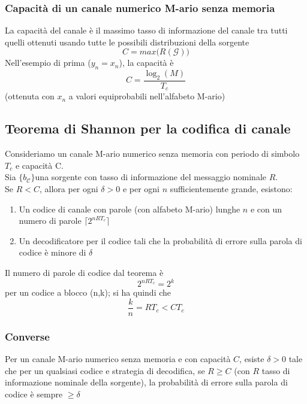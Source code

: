 \documentclass{article}
\begin{document}
\subsubsection{Capacità di un canale numerico M-ario senza memoria}
La capacità del canale è il massimo tasso di informazione del canale tra tutti quelli ottenuti usando tutte le possibili distribuzioni della sorgente $$C=max\big(R(\mathcal{G})\big)$$
Nell'esempio di prima ($y_n=x_n$), la capacità è $$C=\frac{\log_2(M)}{T_c}$$ (ottenuta con $x_n$ a valori equiprobabili nell'alfabeto M-ario)

\subsection{Teorema di Shannon per la codifica di canale}
Consideriamo un canale M-ario numerico senza memoria con periodo di simbolo $T_c$ e capacità C.\\
Sia $\{b_{\mathcal{C}}\}$una sorgente con tasso di informazione del messaggio nominale $R$.\\
Se $R<C$, allora per ogni $\delta>0$ e per ogni $n$ sufficientemente grande, esistono:
\begin{enumerate}
	\item Un codice di canale con parole (con alfabeto M-ario) lunghe $n$ e con un numero di parole $\lceil2^{nRT_c}\rceil$
	\item Un decodificatore per il codice tali che la probabilità di errore sulla parola di codice è minore di $\delta$
\end{enumerate}
Il numero di parole di codice dal teorema è $$2^{nRT_c}=2^k$$ per un codice a blocco (n,k); si ha quindi che $$\frac{k}{n}=RT_c<CT_c$$

\subsubsection{Converse}
Per un canale M-ario numerico senza memoria e con capacità $C$, esiste $\delta>0$ tale che per un qualsiasi codice e strategia di decodifica, se $R\geq C$ (con $R$ tasso di informazione nominale della sorgente), la probabilità di errore sulla parola di codice è sempre $\geq\delta$
\end{document}
